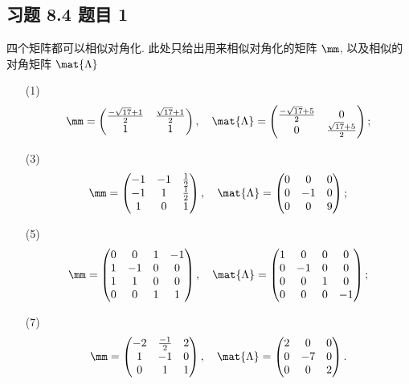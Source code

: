 \subsection*{ 习题 8.4 题目 1 }
\begin{solution}
四个矩阵都可以相似对角化. 此处只给出用来相似对角化的矩阵 $\mm$, 以及相似的对角矩阵 $\mat{\Lambda}$
\begin{enumerate}
    \item[(1)] \[
    \mm = \left(\begin{matrix}
        \frac{-\sqrt{17}+1}{2} & \frac{\sqrt{17}+1}{2} \\
        1 & 1
        \end{matrix}\right), \quad \mat{\Lambda} = \left(\begin{matrix}
            \frac{-\sqrt{17}+5}{2} & 0 \\
            0 & \frac{\sqrt{17}+5}{2}
            \end{matrix}\right);
    \]
    \item[(3)] \[
    \mm = \left(\begin{matrix}
        -1 & -1 & \frac{1}{2} \\
        -1 & 1 & \frac{1}{2} \\
        1 & 0 & 1
        \end{matrix}\right), \quad \mat{\Lambda} = \left(\begin{matrix}
            0 & 0 & 0 \\
            0 & -1 & 0 \\
            0 & 0 & 9
            \end{matrix}\right);
    \]
    \item[(5)] \[
    \mm = \left(\begin{matrix}
        0 & 0 & 1 & -1 \\
        1 & -1 & 0 & 0 \\
        1 & 1 & 0 & 0 \\
        0 & 0 & 1 & 1
        \end{matrix}\right), \quad \mat{\Lambda} = \left(\begin{matrix}
            1 & 0 & 0 & 0 \\
            0 & -1 & 0 & 0 \\
            0 & 0 & 1 & 0 \\
            0 & 0 & 0 & -1
            \end{matrix}\right);
    \]
    \item[(7)] \[
    \mm = \left(\begin{matrix}
        -2 & \frac{-1}{2} & 2 \\
        1 & -1 & 0 \\
        0 & 1 & 1
        \end{matrix}\right), \quad \mat{\Lambda} = \left(\begin{matrix}
            2 & 0 & 0 \\
            0 & -7 & 0 \\
            0 & 0 & 2
            \end{matrix}\right).
    \]
\end{enumerate}
\end{solution}

